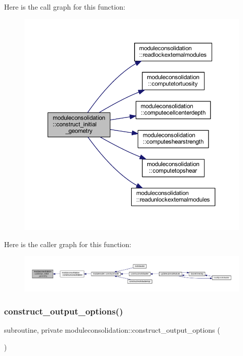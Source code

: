 Here is the call graph for this function\+:\nopagebreak
\begin{figure}[H]
\begin{center}
\leavevmode
\includegraphics[width=350pt]{namespacemoduleconsolidation_aefbb1dd3cecd84ab6814af87893b00d1_cgraph}
\end{center}
\end{figure}
Here is the caller graph for this function\+:\nopagebreak
\begin{figure}[H]
\begin{center}
\leavevmode
\includegraphics[width=350pt]{namespacemoduleconsolidation_aefbb1dd3cecd84ab6814af87893b00d1_icgraph}
\end{center}
\end{figure}
\mbox{\label{namespacemoduleconsolidation_a29241b472f688e15c435e72ca5da5273}} 
\subsubsection{\texorpdfstring{construct\+\_\+output\+\_\+options()}{construct\_output\_options()}}
{\footnotesize\ttfamily subroutine, private moduleconsolidation\+::construct\+\_\+output\+\_\+options (\begin{DoxyParamCaption}{ }\end{DoxyParamCaption})\hspace{0.3cm}{\ttfamily [private]}}

